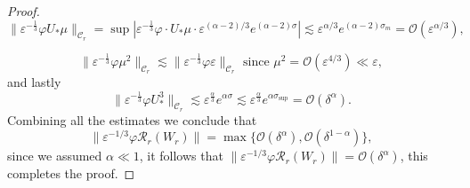 \documentclass[letterpaper,11pt]{article}
\newcommand{\Ral}{\mathcal{R}}
\newcommand{\rmO}{\mathcal{O}}
\newcommand{\eps}{\varepsilon}
\newcommand{\lar}{ \lesssim }
\numberwithin{equation}{section}
\theoremstyle{plain}
\begin{document}
\begin{proof}
\[
\|\eps^{-\frac{1}{3}}\varphi U_*\mu \|_{\mathcal{C}_r} =\sup |\eps^{-\frac{1}{3}} \varphi \cdot U_*\mu \cdot \eps^{(\alpha-2)/3}e^{(\alpha-2)\sigma} | \lar \eps^{\alpha/3} e^{(\alpha-2)\sigma_m}  =\rmO( \eps^{\alpha/3}) ,
\]

\[
\|\eps^{-\frac{1}{3}}\varphi \mu^2 \|_{\mathcal{C}_r} \lar \|\eps^{-\frac{1}{3}}\varphi \eps \|_{\mathcal{C}_r} \text{ since } \mu^2 = \rmO(\eps^{4/3}) \ll \eps, 
\]
and lastly
\[
\|\eps^{-\frac{1}{3}}\varphi U_*^3\|_{\mathcal{C}_r} \lar \eps^{\frac{\alpha}{3}} e^{\alpha\sigma} \lar \eps^{\frac{\alpha}{3}} e^{\alpha\sigma_{\sup}} = \rmO(\delta^\alpha).
\]
Combining all the estimates we conclude that 
\[
\|\eps^{-1/3}\varphi \Ral_r(W_r) \| = \max\{ \rmO(\delta^\alpha), \rmO(\delta^{1-\alpha})\},
\]
since we assumed $\alpha \ll 1$, it follows that $\|\eps^{-1/3}\varphi \Ral_r(W_r) \| = \rmO(\delta^\alpha)$, this completes the proof.
\end{proof}
\end{document}
